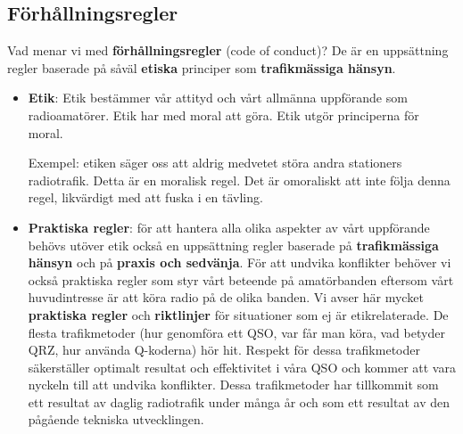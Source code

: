 \subsection{Förhållningsregler}

Vad menar vi med \textbf{förhållningsregler} (code of conduct)?
De är en uppsättning regler baserade på såväl \textbf{etiska} principer som
\textbf{trafikmässiga hänsyn}.

\begin{itemize}
\item \textbf{Etik}: Etik bestämmer vår attityd och vårt allmänna uppförande
  som radioamatörer.
  Etik har med moral att göra.
  Etik utgör principerna för moral.

  Exempel: etiken säger oss att aldrig medvetet störa andra stationers
  radiotrafik.
  Detta är en moralisk regel.
  Det är omoraliskt att inte följa denna regel, likvärdigt med att fuska i en
  tävling.
\item \textbf{Praktiska regler}: för att hantera alla olika aspekter av
  vårt uppförande behövs utöver etik också en uppsättning regler baserade på
  \textbf{trafikmässiga hänsyn} och på \textbf{praxis och sedvänja}.
  För att undvika konflikter behöver vi också praktiska regler som styr
  vårt beteende på amatörbanden eftersom vårt huvudintresse är att köra
  radio på de olika banden.
  Vi avser här mycket \textbf{praktiska regler} och \textbf{riktlinjer} för
  situationer som ej är etikrelaterade.
  De flesta trafikmetoder (hur genomföra ett QSO, var får man köra,
  vad betyder QRZ, hur använda Q-koderna) hör hit.
  Respekt för dessa trafikmetoder säkerställer optimalt resultat och
  effektivitet i våra QSO och kommer att vara nyckeln till att undvika
  konflikter.
  Dessa trafikmetoder har tillkommit som ett resultat av daglig radiotrafik
  under många år och som ett resultat av den pågående tekniska utvecklingen.
\end{itemize}
